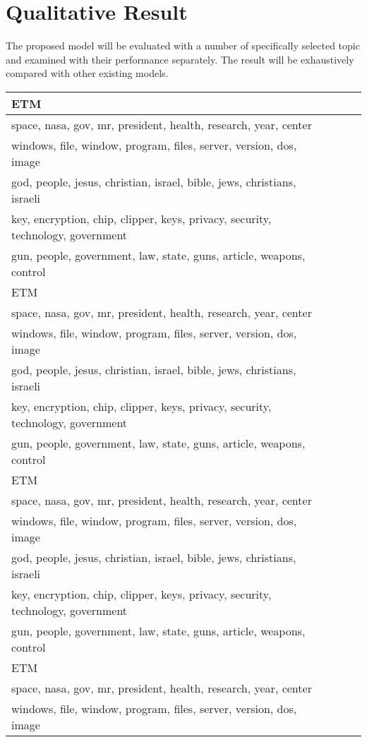 \section{Qualitative Result}The proposed model will be evaluated with a number of specifically selected topic and examined with their performance separately. The result will be exhaustively compared with other existing models.
\begin{table}[]
\centering
\begin{tabular}{llll}
\hline
ETM  \\ \hline
space, nasa, gov, mr, president, health, research, year, center\\
windows, file, window, program, files, server, version, dos, image\\
god, people, jesus, christian, israel, bible, jews, christians, israeli\\
key, encryption, chip, clipper, keys, privacy, security, technology, government\\
gun, people, government, law, state, guns, article, weapons, control
\\ \hline
ETM  \\ \hline
space, nasa, gov, mr, president, health, research, year, center\\
windows, file, window, program, files, server, version, dos, image\\
god, people, jesus, christian, israel, bible, jews, christians, israeli\\
key, encryption, chip, clipper, keys, privacy, security, technology, government\\
gun, people, government, law, state, guns, article, weapons, control
\\ \hline
ETM  \\ \hline
space, nasa, gov, mr, president, health, research, year, center\\
windows, file, window, program, files, server, version, dos, image\\
god, people, jesus, christian, israel, bible, jews, christians, israeli\\
key, encryption, chip, clipper, keys, privacy, security, technology, government\\
gun, people, government, law, state, guns, article, weapons, control
\\ \hline
ETM  \\ \hline
space, nasa, gov, mr, president, health, research, year, center\\
windows, file, window, program, files, server, version, dos, image\\

\end{tabular}
\end{table}
